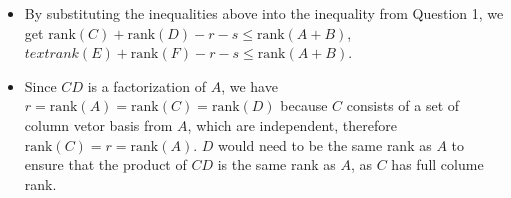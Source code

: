 \documentclass[10pt]{article}
\begin{document}
{{\begin{enumerate}
\begin{itemize}
\begin{itemize}
				\item Since \( \text{col}(E) \subseteq \text{col}(X) \), then \( \text{rank}(E) \leq \text{rank}(X) \).
				\item Since \( \text{row}(D) \subseteq \text{row}(Y) \), then \( \text{rank}(D) \leq \text{rank}(Y) \).
				\item Since \( \text{row}(F) \subseteq \text{row}(Y) \), then \( \text{rank}(F) \leq \text{rank}(Y) \).
			\end{itemize}
			\item By substituting the inequalities above into the inequality from Question 1, we get \( \text{rank}(C) + \text{rank}(D) - r - s \leq \text{rank}(A+B) \), \(text{rank}(E) + \text{rank}(F) - r - s \leq \text{rank}(A+B)\).
			\item Since \(CD\) is a factorization of \(A\), we have \(r = \text{rank}(A) = \text{rank}(C) = \text{rank}(D)\) because $C$ consists of a set of column vetor basis from $A$, which are independent, therefore \(\text{rank}(C) = r = \text{rank}(A)\). $D$ would need to be the same rank as $A$ to ensure that the product of $CD$ is the same rank as $A$, as $C$ has full colume rank.
		\end{itemize}
	\end{enumerate}

	}
}
\end{document}
